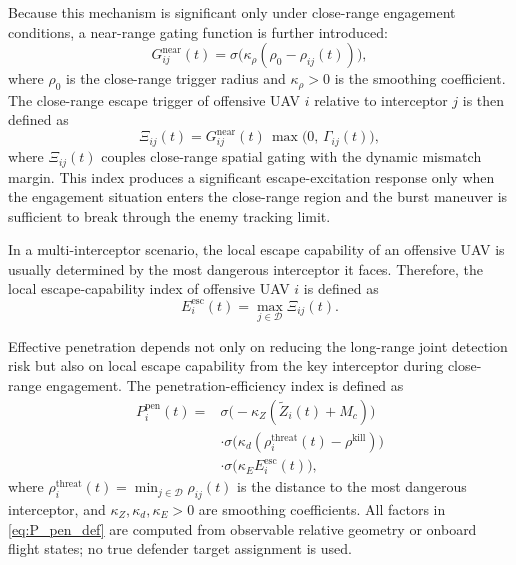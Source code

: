 \documentclass{cja}
\begin{document}
Because this mechanism is significant only under close-range engagement conditions, a near-range gating function is further introduced:
\begin{equation}
G_{ij}^{\mathrm{near}}(t)
=
\sigma\!\bigl(\kappa_{\rho}(\rho_0-\rho_{ij}(t))\bigr),
\end{equation}
where $\rho_0$ is the close-range trigger radius and $\kappa_{\rho}>0$ is the smoothing coefficient. The close-range escape trigger of offensive UAV $i$ relative to interceptor $j$ is then defined as
\begin{equation}
\Xi_{ij}(t)
=
G_{ij}^{\mathrm{near}}(t)\,\max\bigl(0,\, \Gamma_{ij}(t)\bigr),
\end{equation}
where $\Xi_{ij}(t)$ couples close-range spatial gating with the dynamic mismatch margin. This index produces a significant escape-excitation response only when the engagement situation enters the close-range region and the burst maneuver is sufficient to break through the enemy tracking limit.

In a multi-interceptor scenario, the local escape capability of an offensive UAV is usually determined by the most dangerous interceptor it faces. Therefore, the local escape-capability index of offensive UAV $i$ is defined as
\begin{equation}
E_i^{\mathrm{esc}}(t)
=
\max_{j\in\mathcal{D}} \Xi_{ij}(t).
\end{equation}

Effective penetration depends not only on reducing the long-range joint detection risk but also on local escape capability from the key interceptor during close-range engagement. The penetration-efficiency index is defined as
\begin{equation}
\begin{aligned}
P_i^{\mathrm{pen}}(t)
={}&
\sigma\!\bigl(-\kappa_Z(\widetilde Z_i(t)+M_c)\bigr)\\
&\cdot
\sigma\!\bigl(\kappa_d(\rho_i^{\mathrm{threat}}(t)-\rho^{\mathrm{kill}})\bigr)\\
&\cdot
\sigma\!\bigl(\kappa_E E_i^{\mathrm{esc}}(t)\bigr),
\end{aligned}
\label{eq:P_pen_def}
\end{equation}
where $\rho_i^{\mathrm{threat}}(t)=\min_{j\in\mathcal{D}}\rho_{ij}(t)$ is the distance to the most dangerous interceptor, and $\kappa_Z,\kappa_d,\kappa_E>0$ are smoothing coefficients. All factors in \eqref{eq:P_pen_def} are computed from observable relative geometry or onboard flight states; no true defender target assignment is used.
\end{document}
